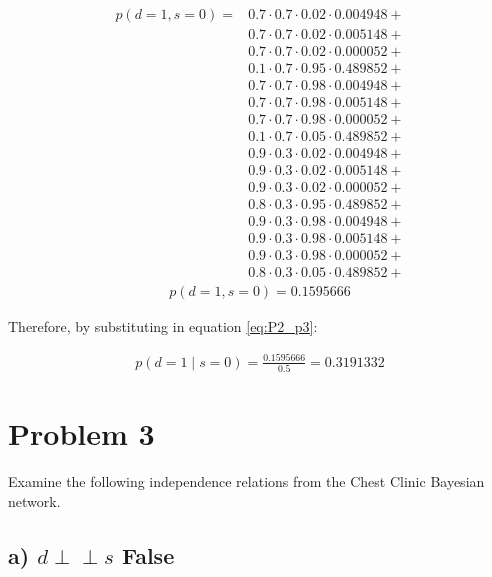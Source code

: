 \documentclass[12pt]{report}
\begin{document}
\begin{align*}    
    p(d=1,s=0) = 
    &0.7 \cdot 0.7 \cdot  0.02 \cdot 0.004948 + \\
    &0.7 \cdot 0.7 \cdot  0.02 \cdot 0.005148 + \\
    &0.7 \cdot 0.7 \cdot  0.02 \cdot 0.000052 + \\
    &0.1 \cdot 0.7 \cdot  0.95 \cdot 0.489852 + \\
    &0.7 \cdot 0.7 \cdot  0.98 \cdot 0.004948 + \\
    &0.7 \cdot 0.7 \cdot  0.98 \cdot 0.005148 + \\
    &0.7 \cdot 0.7 \cdot  0.98 \cdot 0.000052 + \\
    &0.1 \cdot 0.7 \cdot  0.05 \cdot 0.489852 + \\ 
    &0.9 \cdot 0.3 \cdot  0.02 \cdot 0.004948 + \\
    &0.9 \cdot 0.3 \cdot  0.02 \cdot 0.005148 + \\
    &0.9 \cdot 0.3 \cdot  0.02 \cdot 0.000052 + \\
    &0.8 \cdot 0.3 \cdot  0.95 \cdot 0.489852 + \\
    &0.9 \cdot 0.3 \cdot  0.98 \cdot 0.004948 + \\
    &0.9 \cdot 0.3 \cdot  0.98 \cdot 0.005148 + \\
    &0.9 \cdot 0.3 \cdot  0.98 \cdot 0.000052 + \\
    &0.8 \cdot 0.3 \cdot  0.05 \cdot 0.489852 + 
\end{align*}
\begin{align*}    
    p(d = 1, s = 0) =  0.1595666
\end{align*}


Therefore, by substituting in equation \eqref{eq:P2_p3}:

\begin{align*}
    p(d=1 \mid s = 0) = \frac{0.1595666}{0.5} = 0.3191332
\end{align*}

\section*{Problem 3}

Examine the following independence relations from the Chest Clinic Bayesian network.

\subsection*{a) \(d \perp\!\!\!\perp s\) False}
\end{document}
